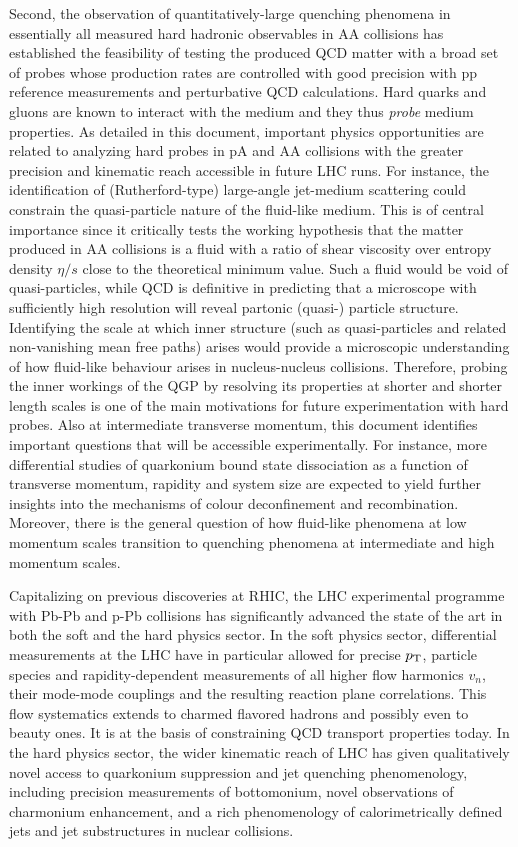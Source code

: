 \documentclass[../report.tex]{subfiles}
\begin{document}
Second, the observation of quantitatively-large quenching phenomena in essentially all measured hard hadronic observables in AA collisions has established the feasibility of testing the produced QCD matter with a broad set of probes whose production rates are controlled with good precision with pp reference measurements and perturbative QCD calculations. Hard quarks and gluons are known to interact with the medium and they thus {\it probe} medium properties. As detailed in this document, important physics opportunities are related to analyzing hard probes in pA and AA collisions with the greater precision and kinematic reach accessible in future LHC runs. For instance, the identification of (Rutherford-type) large-angle jet-medium scattering could constrain the quasi-particle nature of the fluid-like medium. This is of central importance since it critically tests the working hypothesis that the matter produced in AA collisions is a fluid with a ratio of shear viscosity over entropy density $\eta/s$ close to the theoretical minimum value. Such a fluid would be void of quasi-particles, while QCD is definitive in predicting that a microscope with sufficiently high resolution will reveal partonic (quasi-) particle structure. Identifying the scale at which inner structure (such as quasi-particles and related non-vanishing mean free paths) arises would provide a microscopic understanding of how fluid-like behaviour arises in nucleus-nucleus collisions. Therefore, probing the inner workings of the QGP by resolving its properties at shorter and shorter length scales is one of the main motivations for future experimentation with hard probes. Also at intermediate transverse momentum, this document identifies important questions that will be accessible experimentally. For instance, more differential studies of quarkonium bound state dissociation as a function of transverse momentum, rapidity and system size are expected to yield further insights into the mechanisms of colour deconfinement and recombination. Moreover, there is the general question of how fluid-like phenomena at low momentum scales transition to quenching phenomena at intermediate and high momentum scales.

Capitalizing on previous discoveries at RHIC, the LHC experimental programme with Pb-Pb and p-Pb collisions has significantly advanced the state of the art in both the soft and the hard physics sector. In the soft physics sector, differential measurements at the LHC have in particular allowed for precise $p\sb{\scriptstyle\mathrm{T}}$, particle species and rapidity-dependent measurements of all higher flow harmonics $v_n$, their mode-mode couplings and the resulting reaction plane correlations. This flow systematics extends to charmed flavored hadrons and possibly even to beauty ones. It is at the basis of constraining QCD transport properties today. In the hard physics sector, the wider kinematic reach of LHC has given qualitatively novel access to quarkonium suppression and jet quenching phenomenology, including precision measurements of bottomonium, novel observations of charmonium enhancement, and a rich phenomenology of calorimetrically defined jets and jet substructures in nuclear collisions.
\end{document}
